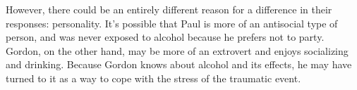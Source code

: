However, there could be an entirely different reason for a difference in their responses: personality. It's possible that Paul is more of an antisocial type of person, and was never exposed to alcohol because he prefers not to party. Gordon, on the other hand, may be more of an extrovert and enjoys socializing and drinking. Because Gordon knows about alcohol and its effects, he may have turned to it as a way to cope with the stress of the traumatic event.